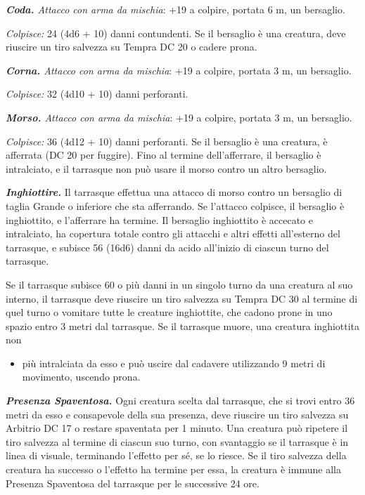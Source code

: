 \begin{multicols}{2}
\emph{\textbf{Coda.} Attacco con arma da mischia}: +19 a colpire,
portata 6 m, un bersaglio.

\emph{Colpisce:} 24 (4d6 + 10) danni contundenti. Se il bersaglio è una
creatura, deve riuscire un tiro salvezza su Tempra DC 20 o cadere prona.

\emph{\textbf{Corna.} Attacco con arma da mischia}: +19 a colpire,
portata 3 m, un bersaglio.

\emph{Colpisce:} 32 (4d10 + 10) danni perforanti.

\emph{\textbf{Morso.} Attacco con arma da mischia}: +19 a colpire,
portata 3 m, un bersaglio.

\emph{Colpisce:} 36 (4d12 + 10) danni perforanti. Se il bersaglio è una
creatura, è afferrata (DC 20 per fuggire). Fino al termine
dell'afferrare, il bersaglio è intralciato, e il tarrasque non può usare
il morso contro un altro bersaglio.

\emph{\textbf{Inghiottire.}} Il tarrasque effettua una attacco di morso
contro un bersaglio di taglia Grande o inferiore che sta afferrando. Se
l'attacco colpisce, il bersaglio è inghiottito, e l'afferrare ha
termine. Il bersaglio inghiottito è accecato e intralciato, ha copertura
totale contro gli attacchi e altri effetti all'esterno del tarrasque, e
subisce 56 (16d6) danni da acido all'inizio di ciascun turno del
tarrasque.

Se il tarrasque subisce 60 o più danni in un singolo turno da una
creatura al suo interno, il tarrasque deve riuscire un tiro salvezza su Tempra DC 30 al termine di quel turno o vomitare tutte le creature
inghiottite, che cadono prone in uno spazio entro 3 metri dal tarrasque.
Se il tarrasque muore, una creatura inghiottita non


\begin{itemize}
\item
  più intralciata da esso e può uscire dal cadavere utilizzando 9 metri
  di movimento, uscendo prona.
\end{itemize}


\emph{\textbf{Presenza Spaventosa.}} Ogni creatura scelta dal tarrasque,
che si trovi entro 36 metri da esso e consapevole della sua presenza,
deve riuscire un tiro salvezza su Arbitrio DC 17 o restare spaventata
per 1 minuto. Una creatura può ripetere il tiro salvezza al termine di
ciascun suo turno, con svantaggio se il tarrasque è in linea di visuale,
terminando l'effetto per sé, se lo riesce. Se il tiro salvezza della
creatura ha successo o l'effetto ha termine per essa, la creatura è
immune alla Presenza Spaventosa del tarrasque per le successive 24 ore.


\end{multicols}
